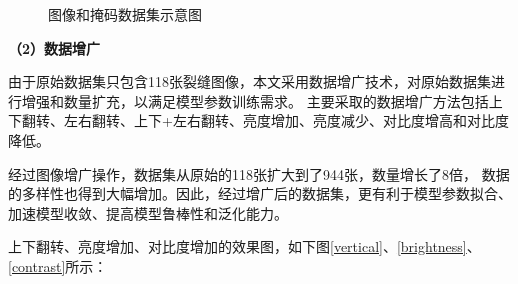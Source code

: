 \begin{figure}[H]
\caption{图像和掩码数据集示意图}
\end{figure}

\textbf{（2）数据增广}

由于原始数据集只包含118张裂缝图像，本文采用数据增广技术，对原始数据集进行增强和数量扩充，以满足模型参数训练需求。
主要采取的数据增广方法包括上下翻转、左右翻转、上下+左右翻转、亮度增加、亮度减少、对比度增高和对比度降低。

经过图像增广操作，数据集从原始的118张扩大到了944张，数量增长了8倍，
数据的多样性也得到大幅增加。因此，经过增广后的数据集，更有利于模型参数拟合、加速模型收敛、提高模型鲁棒性和泛化能力。

上下翻转、亮度增加、对比度增加的效果图，如下图\ref{vertical}、\ref{brightness}、\ref{contrast}所示：

